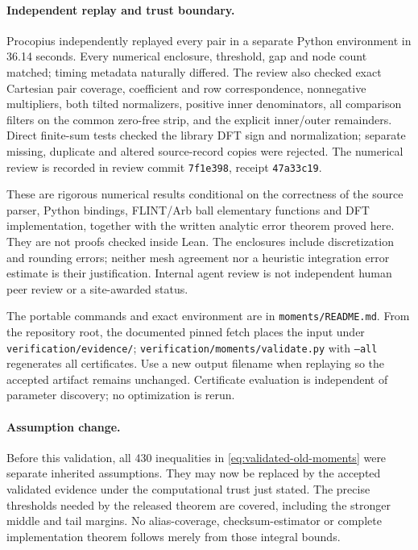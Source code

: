 \paragraph{Independent replay and trust boundary.}
Procopius independently replayed every pair in a separate Python
environment in 36.14 seconds. Every numerical enclosure, threshold,
gap and node count matched; timing metadata naturally differed.
The review also checked exact Cartesian pair coverage, coefficient
and row correspondence, nonnegative multipliers, both tilted
normalizers, positive inner denominators, all comparison filters on
the common zero-free strip, and the explicit inner/outer remainders.
Direct finite-sum tests checked the library DFT sign and normalization;
separate missing, duplicate and altered source-record copies were
rejected. The numerical review is recorded in review commit
\texttt{7f1e398}, receipt \texttt{47a33c19}.

These are rigorous numerical results conditional on the correctness
of the source parser, Python bindings, FLINT/Arb ball elementary
functions and DFT implementation, together with the written analytic
error theorem proved here. They are not proofs checked inside Lean.
The enclosures include discretization and rounding errors; neither
mesh agreement nor a heuristic integration error estimate is their
justification. Internal agent review is not independent human peer
review or a site-awarded status.

The portable commands and exact environment are in
\texttt{moments/README.md}. From the repository root, the documented
pinned fetch places the input under \texttt{verification/evidence/};
\texttt{verification/moments/validate.py} with \texttt{--all} regenerates
all certificates. Use a new output filename when replaying so the
accepted artifact remains unchanged. Certificate evaluation is
independent of parameter discovery; no optimization is rerun.

\paragraph{Assumption change.}
Before this validation, all 430 inequalities in
\eqref{eq:validated-old-moments} were separate inherited assumptions.
They may now be replaced by the accepted validated evidence under
the computational trust just stated. The precise thresholds needed
by the released theorem are covered, including the stronger middle
and tail margins. No alias-coverage, checksum-estimator or complete
implementation theorem follows merely from those integral bounds.
